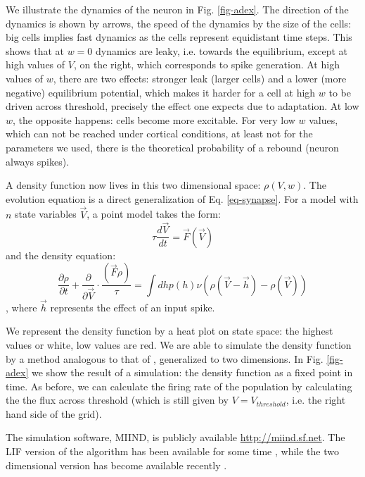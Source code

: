 \documentclass[10pt]{article}
\begin{document}
We illustrate the dynamics of the neuron in Fig. \ref{fig-adex}.
The direction of the dynamics is shown by arrows, the speed of the dynamics by the size of the cells:
big cells implies fast dynamics as the cells represent equidistant time steps.
This shows that at $w =0$ dynamics are leaky,  i.e. towards the equilibrium, except at high values of $V$, on the right, which corresponds to spike generation.
At high values of $w$, there are two effects: stronger leak (larger cells) and a lower (more negative) equilibrium potential, which makes it harder for a cell at high $w$ to be driven across threshold, precisely the effect one expects due to adaptation.
At low $w$, the opposite happens: cells become more excitable.
For very low $w$ values, which can not be reached under cortical conditions, at least not for the parameters we used, there is the theoretical probability of a rebound (neuron always spikes).

A density function now lives in this two dimensional space: $\rho(V,w)$.
The evolution equation is a direct generalization of Eq. \ref{eq-synapse}.
For a model with $n$ state variables $\vec{V}$, a point model takes the form:
\begin{equation}
\tau \frac{d \vec{V}}{dt} = \vec{F}(\vec{V})
\end{equation}
and the density equation:
\begin{equation}
\frac{\partial \rho}{\partial t} + \frac{\partial}{\partial \vec{V}} \cdot \frac{( \vec{F} \rho)}{\tau} = \int dh p(h) \nu (\rho(\vec{V} - \vec{h}) -\rho(\vec{V}))
\end{equation},
where $\vec{h}$ represents the effect of an input spike.

We represent the density function by a heat plot on state space: the highest values or white, low values are red.
We are able to simulate the density function by a method analogous to that of \cite{de2013generica,iyer2013influence}, generalized to two dimensions.
In Fig. \ref{fig-adex} we show the result of a simulation: the density function as a fixed point in time.
As before, we can calculate the firing rate of the population by calculating the the flux across threshold (which is still given by $V= V_{threshold}$, i.e. the right hand side of the grid).

The simulation software, MIIND, is publicly available \url{http://miind.sf.net}. The LIF version of the algorithm has been available for some time \cite{de_Kamps_2008}, while 
the two dimensional version has become available recently \cite{dekamps2017b}.
\end{document}
